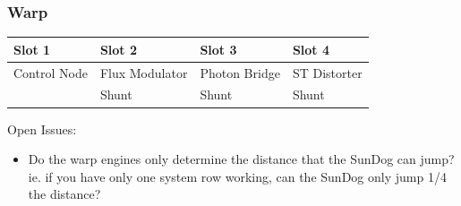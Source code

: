 
\subsubsection{Warp}

\begin{tabular}{ | p{2.5cm} | p{2.5cm} | p{2.5cm} | p{2.5cm} | }
\hline
Slot 1 & Slot 2 & Slot 3 & Slot 4 \\ \hline
Control Node & Flux Modulator & Photon Bridge & ST Distorter \\
& Shunt & Shunt & Shunt \\
\hline
\end{tabular}

Open Issues:
\begin{itemize}
\item Do the warp engines only determine the distance that the SunDog
can jump?  ie. if you have only one system row working, can the SunDog
only jump 1/4 the distance?
\end{itemize}

